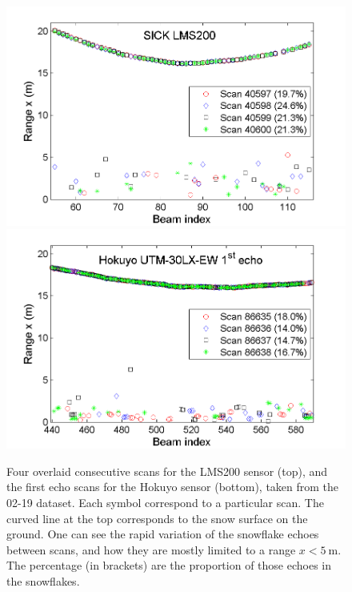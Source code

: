  \begin{figure}[th]
    \centering
    \includegraphics[width=0.95\linewidth]{./img/LMS200_4Scans_Feb19.png}
    \includegraphics[width=0.95\linewidth]{./img/Hokuyo_4Scans_Feb19.png}
    \caption{Four overlaid consecutive scans for the LMS200 sensor (top), and the first echo scans for the Hokuyo sensor (bottom), taken from the 02-19 dataset. Each symbol correspond to a particular scan. The curved line at the top corresponds to the snow surface on the ground. One can see the rapid variation of the snowflake echoes between scans, and how they are mostly limited to a range $x<\SI{5}{\meter}$. The percentage (in brackets) are the proportion of those echoes in the snowflakes. }
    \label{fig:LMS200_4Scans_Feb19}
\end{figure}

